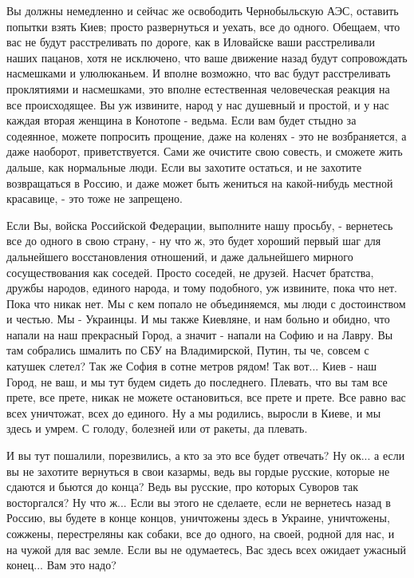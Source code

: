 Вы должны немедленно и сейчас же освободить Чернобыльскую АЭС, оставить попытки взять Киев; просто
развернуться и уехать, все до одного. Обещаем, что вас не будут расстреливать
по дороге, как в Иловайске ваши расстреливали наших пацанов, хотя не исключено,
что ваше движение назад будут сопровождать насмешками и улюлюканьем. И вполне
возможно, что вас будут расстреливать проклятиями и насмешками, это вполне
естественная человеческая реакция на все происходящее. Вы уж извините, народ у
нас душевный и простой, и у нас каждая вторая женщина в Конотопе - ведьма. Если
вам будет стыдно за содеянное, можете попросить прощение, даже на коленях - это
не возбраняется, а даже наоборот, приветствуется. Сами же очистите свою
совесть, и сможете жить дальше, как нормальные люди. Если вы захотите остаться,
и не захотите возвращаться в Россию, и даже может быть жениться на какой-нибудь
местной красавице, - это тоже не запрещено.

Если Вы, войска Российской Федерации, выполните нашу просьбу, - вернетесь все до
одного в свою страну, - ну что ж, это будет хороший первый шаг для дальнейшего
восстановления отношений, и даже дальнейшего мирного сосуществования как
соседей. Просто соседей, не друзей. Насчет братства, дружбы народов, единого
народа, и тому подобного, уж извините, пока что нет.  Пока что никак нет. Мы с
кем попало не объединяемся, мы люди с достоинством и честью. Мы - Украинцы. 
И мы также Киевляне, и нам больно и обидно, что напали на наш
прекрасный Город, а значит - напали на Софию и на Лавру. Вы там собрались
шмалить по СБУ на Владимирской, Путин, ты че, совсем с катушек слетел? Так же
София в сотне метров рядом! Так вот... Киев - наш Город, не ваш, и мы тут будем
сидеть до последнего.  Плевать, что вы там все прете, все прете, никак не
можете остановиться, все прете и прете. Все равно вас всех уничтожат, всех до
единого. Ну а мы родились, выросли в Киеве, и мы здесь и умрем. С голоду,
болезней или от ракеты, да плевать.

И вы тут пошалили, порезвились, а кто за это все будет отвечать? Ну ок... а
если вы не захотите вернуться в свои казармы, ведь вы гордые русские, которые не сдаются и бьются до
конца? Ведь вы русские, про которых Суворов так восторгался? Ну что ж...  Если
вы этого не сделаете, если не вернетесь назад в Россию, вы будете в конце
концов, уничтожены здесь в Украине, уничтожены, сожжены, перестреляны как
собаки, все до одного, на своей, родной для нас, и на чужой для вас земле.
Если вы не одумаетесь, Вас здесь всех ожидает ужасный конец... Вам это надо?

